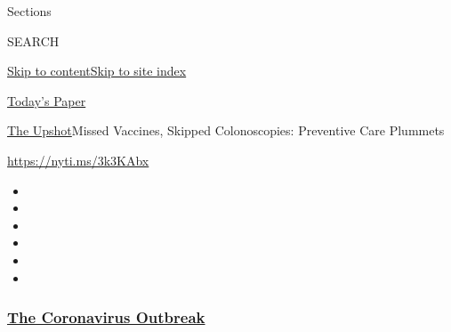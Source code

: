 Sections

SEARCH

\protect\hyperlink{site-content}{Skip to
content}\protect\hyperlink{site-index}{Skip to site index}

\href{https://myaccount.nytimes3xbfgragh.onion/auth/login?response_type=cookie\&client_id=vi}{}

\href{https://www.nytimes3xbfgragh.onion/section/todayspaper}{Today's
Paper}

\href{/section/upshot}{The Upshot}\textbar{}Missed Vaccines, Skipped
Colonoscopies: Preventive Care Plummets

\url{https://nyti.ms/3k3KAbx}

\begin{itemize}
\item
\item
\item
\item
\item
\item
\end{itemize}

\hypertarget{the-coronavirus-outbreak}{%
\subsubsection{\texorpdfstring{\href{https://www.nytimes3xbfgragh.onion/news-event/coronavirus?name=styln-coronavirus-national\&region=TOP_BANNER\&block=storyline_menu_recirc\&action=click\&pgtype=Article\&impression_id=27181fc0-f52c-11ea-bb3a-a9cd15cea7c9\&variant=undefined}{The
Coronavirus
Outbreak}}{The Coronavirus Outbreak}}\label{the-coronavirus-outbreak}}

